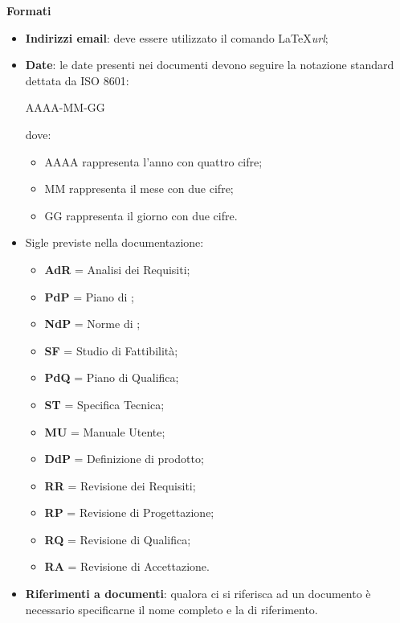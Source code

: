\textbf{Formati} 
\begin{itemize}
\item \textbf{Indirizzi email}: deve essere utilizzato il comando \LaTeX \textit{url};
\item \textbf{Date}: le date presenti nei documenti devono seguire la notazione standard dettata da ISO 8601:

  \begin{center}
    AAAA-MM-GG
  \end{center}
  
  dove:
  \begin{itemize}
  \item AAAA rappresenta l'anno con quattro cifre;
  \item MM rappresenta il mese con due cifre;
  \item GG rappresenta il giorno con due cifre.
  \end{itemize}
\item Sigle previste nella documentazione:
  \begin{itemize}
  \item \textbf{AdR} = Analisi dei Requisiti;
  \item \textbf{PdP} = Piano di ;
  \item \textbf{NdP} = Norme di ;
  \item \textbf{SF} = Studio di Fattibilità;
  \item \textbf{PdQ} = Piano di Qualifica;
  \item \textbf{ST} = Specifica Tecnica;
  \item \textbf{MU} = Manuale Utente;
  \item \textbf{DdP} = Definizione di prodotto;
  \item \textbf{RR} = Revisione dei Requisiti;
  \item \textbf{RP} = Revisione di Progettazione;
  \item \textbf{RQ} = Revisione di Qualifica;
  \item \textbf{RA} = Revisione di Accettazione.
  \end{itemize}
\item \textbf{Riferimenti a documenti}: qualora ci si riferisca ad un documento è necessario specificarne il nome completo e la  di riferimento.
\end{itemize}




